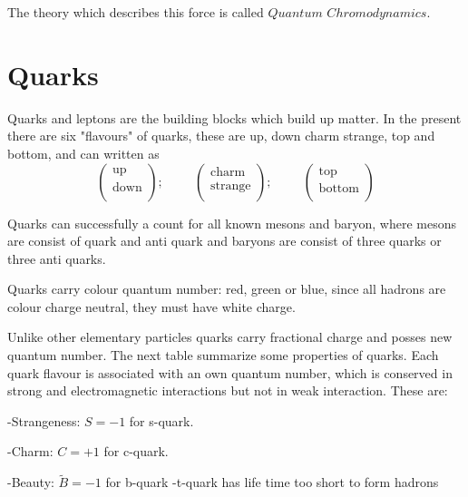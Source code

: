 The theory which describes this force is called $Quantum$ $Chromodynamics$.
\section{Quarks}
Quarks and leptons are the building blocks which build up matter. In the present there are six "flavours" of quarks, these are up, down charm strange, top and bottom, and can written as
        \begin{equation*} \left( \begin{array}{c}          
           \text{up}\\
           \text{down}\\
         \end{array}
         \right);  \hspace{1cm}    
     \left (\begin{array}{c}
              \text{charm}\\
              \text{strange}\\
               \end{array}
                 \right)  ;  \hspace{1cm} 
               \left( \begin{array}{c}
                       \text{top}\\
                       \text{bottom}\\
                      \end{array}
                     \right) \end{equation*}  
                         
Quarks can successfully a count for all known mesons and baryon, where mesons are consist of quark and anti quark and baryons are consist of three quarks or three anti quarks. 

Quarks carry colour quantum number: red, green or blue, since all hadrons are colour charge neutral, they must have white charge. 

Unlike other elementary particles quarks carry fractional charge and posses new quantum number. The next table summarize some properties of quarks. Each quark flavour is associated with an own quantum number, which is conserved in strong and electromagnetic interactions but not in weak interaction.
These are: 

\noindent -Strangeness: $S=-1$ for s-quark. 

-Charm: $C=+1$ for c-quark. 

-Beauty: $\tilde{B}=-1$ for b-quark 
-t-quark has life time too short to form hadrons 

